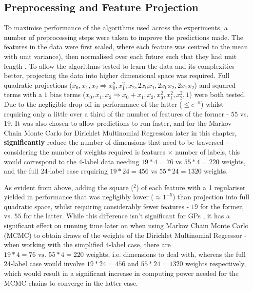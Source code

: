 \subsection{Preprocessing and Feature Projection}
To maximise performance of the algorithms used across the experiments, a number of preprocessing steps were taken to improve the predictions made. The features in the data were first scaled, where each feature was centred to the mean with unit variance), then normalised over each future such that they had unit length . To allow the algorithms tested to learn the data and its complexities better, projecting the data into higher dimensional space was required. Full quadratic projections ($x_0, x_1, x_2 \Rightarrow x_0^2 ,x_1^2 ,x_2 ,2x_0x_1 ,2x_0x_2 ,2x_1x_2$) and squared terms with a $1$ bias terms ($x_0, x_1, x_2 \Rightarrow x_0 + x_1 , x_2 ,x_0^2 ,x_1^2, x_2^2, 1$) were both tested. Due to the negligible drop-off in performance of the latter ($\leq e^{-5}$) whilst requiring only a little over a third of the number of features of the former - $55$ vs. $19$. It was also chosen to allow predictions to run faster, and for the Markov Chain Monte Carlo for Dirichlet Multinomial Regression later in this chapter, \textbf{significantly} reduce the number of dimensions that need to be traversed - considering the number of weights required is features $\times$ number of labels, this would correspond to the 4-label data needing $19*4=76$ vs $55*4=220$ weights, and the full 24-label case requiring $19*24=456$ vs $55*24=1320$ weights.



As evident from above, adding the square ($^2$) of each feature with a 1 regulariser  yielded in performance that was negligibly lower ($\approx1^{-5}$) than projection into full quadratic space, whilst requiring considerably fewer features - $19$ for the former, vs. $55$ for the latter. While this difference isn't significant for GPs , it has a significant effect on running time later on when using Markov Chain Monte Carlo (MCMC) to obtain draws of the weights of the Dirichlet Multinomial Regressor - when working with the simplified 4-label case, there are $19*4 =76 \text{ vs. } 55*4=220$ weights, i.e. dimensions to deal with, whereas the full 24-label case would involve $19*24=456$ and $55*24=1320$ weights respectively, which would result in a significant increase in computing power needed for the MCMC chains to converge in the latter case.

